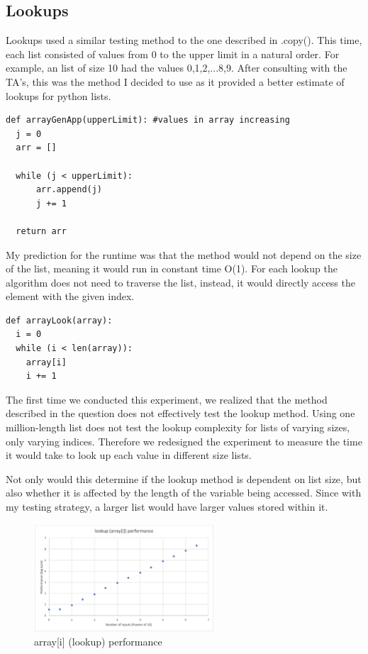 \documentclass[12pt]{article}
\begin{document}
\subsection{Lookups}

Lookups used a similar testing method to the one described in .copy(). This time, each list consisted of values from 0 to the upper limit in a natural order. For example, an list of size 10 had the values 0,1,2,...8,9. After consulting with the TA's, this was the method I decided to use as it provided a better estimate of lookups for python lists.

\footnotesize
\begin{verbatim}
def arrayGenApp(upperLimit): #values in array increasing
  j = 0
  arr = []
  
  while (j < upperLimit):
      arr.append(j)
      j += 1

  return arr
\end{verbatim}
\normalsize

My prediction for the runtime was that the method would not depend on the size of the list, meaning it would run in constant time O(1). For each lookup the algorithm does not need to traverse the list, instead, it would directly access the element with the given index. 

\footnotesize
\begin{verbatim}
def arrayLook(array):
  i = 0
  while (i < len(array)): 
    array[i]
    i += 1
\end{verbatim}
\normalsize

The first time we conducted this experiment, we realized that the method described in the question does not effectively test the lookup method. Using one million-length list does not test the lookup complexity for lists of varying sizes, only varying indices. Therefore we redesigned the experiment to 
measure the time it would take to look up each value in different size lists. 

Not only would this determine if the lookup method is dependent on list size, but also whether it is affected by the length of the variable being accessed. Since with my testing strategy, a larger list would have larger values stored within it.

\begin{figure}[H]
\centering
\includegraphics[width=0.6\textwidth,height=\textheight,keepaspectratio]{lookupgraph.png}
\caption{array[i] (lookup) performance}
\label{Figure: lookupgraph}
\end{figure}
\end{document}
